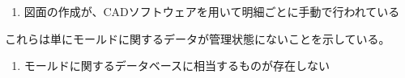 \begin{Tabbox}[title={図面の作成}]
\begin{enumerate}
\item 図面の作成が、CADソフトウェアを用いて明細ごとに手動で行われている
\end{enumerate}
\end{Tabbox}
これらは単にモールドに関するデータが管理状態にないことを示している。
\begin{Tabbox}[title={非管理状態のモールドデータ}]
\begin{enumerate}
\item モールドに関するデータベースに相当するものが存在しない
\end{enumerate}
\end{Tabbox}





